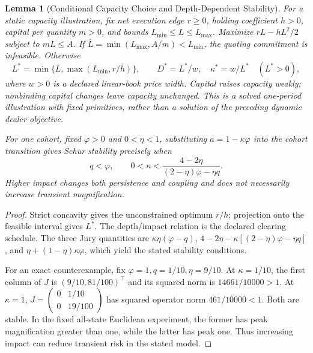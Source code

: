 \documentclass[12pt]{article}
\newtheorem{lemma}[theorem]{Lemma}
\theoremstyle{definition}
\theoremstyle{remark}
\begin{document}
\begin{lemma}[Conditional Capacity Choice and Depth-Dependent Stability]
\label{lem:endogenous_kappa}
For a static capacity illustration, fix net execution edge $r\ge0$, holding coefficient $h>0$, capital per quantity $m>0$, and bounds $L_{\min}\le L\le L_{\max}$. Maximize $rL-hL^2/2$ subject to $mL\le A$. If $\bar L=\min(L_{\max},A/m)<L_{\min}$, the quoting commitment is infeasible. Otherwise
\begin{equation}
L^*=\min\{\bar L,\max(L_{\min},r/h)\},\qquad
D^*=L^*/w,\quad \kappa^*=w/L^*\quad(L^*>0),
\label{eq:endogenous_kappa}
\end{equation}
where $w>0$ is a declared linear-book price width. Capital raises capacity weakly; nonbinding capital changes leave capacity unchanged. This is a solved one-period illustration with fixed primitives, rather than a solution of the preceding dynamic dealer objective.

For one cohort, fixed $\varphi>0$ and $0<\eta<1$, substituting $a=1-\kappa\varphi$ into the cohort transition gives Schur stability precisely when
\[
q<\varphi,\qquad
0<\kappa<\frac{4-2\eta}{(2-\eta)\varphi-\eta q}.
\]
Higher impact changes both persistence and coupling and does not necessarily increase transient magnification.
\end{lemma}
\begin{proof}
Strict concavity gives the unconstrained optimum $r/h$; projection onto the feasible interval gives $L^*$. The depth/impact relation is the declared clearing schedule. The three Jury quantities are $\kappa\eta(\varphi-q)$, $4-2\eta-\kappa[(2-\eta)\varphi-\eta q]$, and $\eta+(1-\eta)\kappa\varphi$, which yield the stated stability conditions.

For an exact counterexample, fix $\varphi=1,q=1/10,\eta=9/10$. At $\kappa=1/10$, the first column of $J$ is $(9/10,81/100)^\top$ and its squared norm is $14661/10000>1$. At $\kappa=1$, $J=\left(\begin{smallmatrix}0&1/10\\0&19/100\end{smallmatrix}\right)$ has squared operator norm $461/10000<1$. Both are stable. In the fixed all-state Euclidean experiment, the former has peak magnification greater than one, while the latter has peak one. Thus increasing impact can reduce transient risk in the stated model.
\end{proof}
\end{document}
